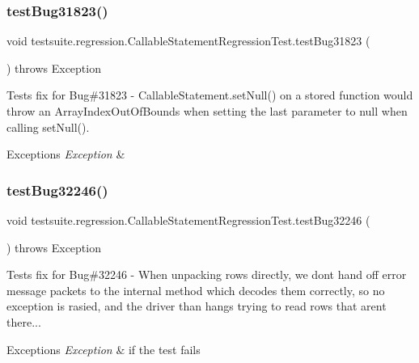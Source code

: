 \subsubsection{\texorpdfstring{test\+Bug31823()}{testBug31823()}}
{\footnotesize\ttfamily void testsuite.\+regression.\+Callable\+Statement\+Regression\+Test.\+test\+Bug31823 (\begin{DoxyParamCaption}{ }\end{DoxyParamCaption}) throws Exception}

Tests fix for Bug\#31823 -\/ Callable\+Statement.\+set\+Null() on a stored function would throw an Array\+Index\+Out\+Of\+Bounds when setting the last parameter to null when calling set\+Null().


\begin{DoxyExceptions}{Exceptions}
{\em Exception} & \\
\hline
\end{DoxyExceptions}
\mbox{\label{classtestsuite_1_1regression_1_1_callable_statement_regression_test_ae409019fbd71b0dbfac43b3a30ed326e}} 
\subsubsection{\texorpdfstring{test\+Bug32246()}{testBug32246()}}
{\footnotesize\ttfamily void testsuite.\+regression.\+Callable\+Statement\+Regression\+Test.\+test\+Bug32246 (\begin{DoxyParamCaption}{ }\end{DoxyParamCaption}) throws Exception}

Tests fix for Bug\#32246 -\/ When unpacking rows directly, we don\textquotesingle{}t hand off error message packets to the internal method which decodes them correctly, so no exception is rasied, and the driver than hangs trying to read rows that aren\textquotesingle{}t there...


\begin{DoxyExceptions}{Exceptions}
{\em Exception} & if the test fails \\
\hline
\end{DoxyExceptions}
\mbox{\label{classtestsuite_1_1regression_1_1_callable_statement_regression_test_a6c39c2788d35a24b2933541c30b8738d}} 
